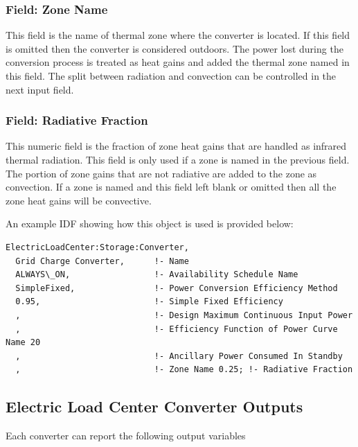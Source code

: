 \subsubsection{Field: Zone Name}\label{field-zone-name-4-000}

This field is the name of thermal zone where the converter is located. If this field is omitted then the converter is considered outdoors. The power lost during the conversion process is treated as heat gains and added the thermal zone named in this field. The split between radiation and convection can be controlled in the next input field.

\subsubsection{Field: Radiative Fraction}\label{field-zone-rad-fract}

This numeric field is the fraction of zone heat gains that are handled as infrared thermal radiation. This field is only used if a zone is named in the previous field. The portion of zone gains that are not radiative are added to the zone as convection. If a zone is named and this field left blank or omitted then all the zone heat gains will be convective.

An example IDF showing how this object is used is provided below:

\begin{lstlisting}
ElectricLoadCenter:Storage:Converter,
  Grid Charge Converter,      !- Name
  ALWAYS\_ON,                 !- Availability Schedule Name
  SimpleFixed,                !- Power Conversion Efficiency Method
  0.95,                       !- Simple Fixed Efficiency
  ,                           !- Design Maximum Continuous Input Power
  ,                           !- Efficiency Function of Power Curve Name 20
  ,                           !- Ancillary Power Consumed In Standby
  ,                           !- Zone Name 0.25; !- Radiative Fraction
\end{lstlisting}

\subsection{Electric Load Center Converter Outputs}\label{electric-load-center-converter-outputs}

Each converter can report the following output variables

